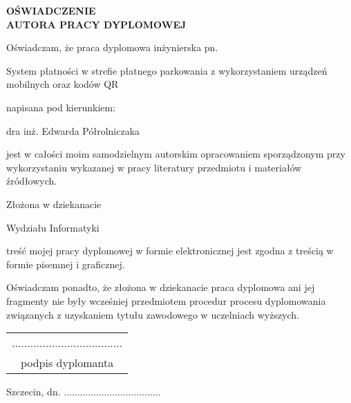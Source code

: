 
\vspace*{\fill}

\begin{center}
	{\large \textbf{OŚWIADCZENIE\\AUTORA PRACY DYPLOMOWEJ}}
\end{center}

\vspace{1cm}

Oświadczam, że praca dyplomowa inżynierska pn.

\begin{center}
	System płatności w strefie płatnego parkowania z wykorzystaniem urządzeń mobilnych oraz kodów QR
\end{center}

napisana pod kierunkiem:

\begin{center}
	dra inż. Edwarda Półrolniczaka
\end{center}

jest w całości moim samodzielnym autorskim opracowaniem sporządzonym przy wykorzystaniu wykazanej w pracy literatury przedmiotu i materiałów źródłowych. 

Złożona w dziekanacie

\begin{center}
	Wydziału Informatyki
\end{center}

treść  mojej pracy dyplomowej w formie elektronicznej jest zgodna z treścią w formie pisemnej i graficznej.

Oświadczam ponadto, że złożona w dziekanacie praca dyplomowa ani jej fragmenty nie były wcześniej przedmiotem procedur procesu dyplomowania związanych z uzyskaniem tytułu zawodowego w uczelniach wyższych.

\vspace{2cm}

\begin{flushright}
	\begin{tabular}{ c }
		{\footnotesize ....................................}\\[-.8em]
		{\footnotesize podpis dyplomanta}
	\end{tabular}
\end{flushright}

\vspace{1cm}

{\footnotesize Szczecin, dn. ....................................}

\vspace*{\fill}